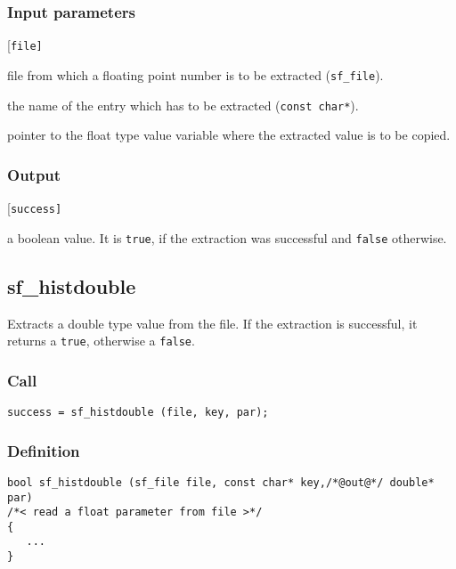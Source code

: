 \subsubsection*{Input parameters}
\begin{desclist}{\tt }{\quad}[\tt file]
   \setlength\itemsep{0pt}
   \item[file] file from which a floating point number is to be extracted (\texttt{sf\_file}).
   \item[key]  the name of the entry which has to be extracted (\texttt{const char*}).
   \item[par]  pointer to the float type value variable where the extracted value is to be copied.
\end{desclist}

\subsubsection*{Output}
\begin{desclist}{\tt }{\quad}[\tt success]
   \setlength\itemsep{0pt}
   \item[success] a boolean value. It is \texttt{true}, if the extraction was successful and \texttt{false} otherwise.
\end{desclist}



\subsection{{sf\_histdouble}}
Extracts a double type value from the file. If the extraction is successful, it returns a \texttt{true}, otherwise a \texttt{false}. 

\subsubsection*{Call}
\begin{verbatim}success = sf_histdouble (file, key, par);\end{verbatim}

\subsubsection*{Definition}
\begin{verbatim}
bool sf_histdouble (sf_file file, const char* key,/*@out@*/ double* par) 
/*< read a float parameter from file >*/
{
   ...
}
\end{verbatim}

